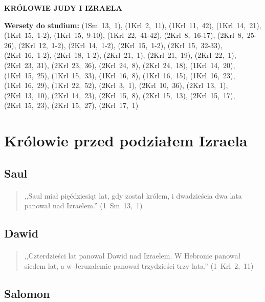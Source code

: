 \documentclass[10pt,a4paper,oneside]{article}
\begin{document}
\centerline{\textbf{\MakeUppercase{Królowie Judy i Izraela}}}
\begin{center}
\textbf{Wersety do studium:} 
\mbox{(1Sm 13, 1)}, \mbox{(1Krl 2, 11)}, \mbox{(1Krl 11, 42)}, \mbox{(1Krl 14, 21)}, \mbox{(1Krl 15, 1-2)}, \mbox{(1Krl 15, 9-10)}, \mbox{(1Krl 22, 41-42)}, \mbox{(2Krl 8, 16-17)}, \mbox{(2Krl 8, 25-26)}, \mbox{(2Krl 12, 1-2)}, \mbox{(2Krl 14, 1-2)}, \mbox{(2Krl 15, 1-2)}, \mbox{(2Krl 15, 32-33)}, \mbox{(2Krl 16, 1-2)}, \mbox{(2Krl 18, 1-2)}, \mbox{(2Krl 21, 1)}, \mbox{(2Krl 21, 19)}, \mbox{(2Krl 22, 1)}, \mbox{(2Krl 23, 31)}, \mbox{(2Krl 23, 36)}, \mbox{(2Krl 24, 8)}, \mbox{(2Krl 24, 18)}, \mbox{(1Krl 14, 20)}, \mbox{(1Krl 15, 25)}, \mbox{(1Krl 15, 33)}, \mbox{(1Krl 16, 8)}, \mbox{(1Krl 16, 15)}, \mbox{(1Krl 16, 23)}, \mbox{(1Krl 16, 29)}, \mbox{(1Krl 22, 52)}, \mbox{(2Krl 3, 1)}, \mbox{(2Krl 10, 36)}, \mbox{(2Krl 13, 1)}, \mbox{(2Krl 13, 10)}, \mbox{(2Krl 14, 23)}, \mbox{(2Krl 15, 8)}, \mbox{(2Krl 15, 13)}, \mbox{(2Krl 15, 17)}, \mbox{(2Krl 15, 23)}, \mbox{(2Krl 15, 27)}, \mbox{(2Krl 17, 1)}
\end{center}
\section{Królowie przed podziałem Izraela}
\subsection{Saul}
\paragraph{}
\begin{quote}
,,Saul miał pięćdziesiąt lat, gdy został królem, i dwadzieścia dwa lata panował nad Izraelem.'' \mbox{(1 Sm 13, 1)}
\end{quote}
\subsection{Dawid}
\paragraph{}
\begin{quote}
,,Czterdzieści lat panował Dawid nad Izraelem. W Hebronie panował siedem lat, a w Jeruzalemie panował trzydzieści trzy lata.'' \mbox{(1 Krl 2, 11)}
\end{quote}
\subsection{Salomon}
\end{document}
